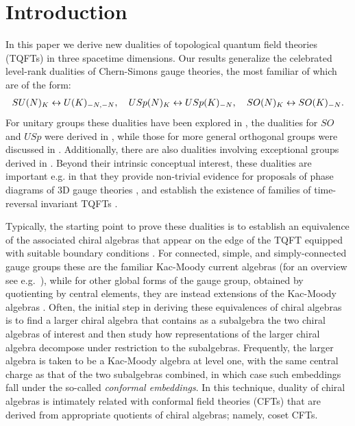 \documentclass[11pt]{article}
\numberwithin{equation}{section}
\begin{document}
\setcounter{tocdepth}{4}

\tableofcontents







\newpage

\section{Introduction}
\label{sec:intro}



In this paper we derive new dualities of topological quantum field theories (TQFTs) in three spacetime dimensions.  Our results generalize the celebrated level-rank dualities of Chern-Simons gauge theories, the most familiar of which are of the form:
\begin{equation}
\begin{tabular}{lll}
   $ SU(N)_{K}\leftrightarrow U(K)_{-N,-N}$, & $USp(N)_{K}\leftrightarrow USp(K)_{-N}$, & $SO(N)_{K}\leftrightarrow SO(K)_{-N}$.
    \end{tabular}
\end{equation}
For unitary groups these dualities have been explored in \cite{Nakanishi:1990hj,Naculich:1990pa, Mlawer:1990uv, Witten:1993xi, Douglas:1994ex, Naculich:2007nc, Hsin:2016blu}, the dualities for $SO$ and $USp$ were derived in \cite{Aharony:2016jvv}, while those for more general orthogonal groups were discussed in \cite{Cordova:2017vab}.  Additionally, there are also dualities involving exceptional groups derived in \cite{Cordova:2018qvg}. Beyond their intrinsic conceptual interest, these dualities are important e.g. in that they provide non-trivial evidence for proposals of phase diagrams of 3D gauge theories \cite{Hsin:2016blu, Gomis:2017ixy}, and establish the existence of families of time-reversal invariant TQFTs \cite{Cordova:2017kue}.


Typically, the starting point to prove these dualities is to establish an equivalence of the associated chiral algebras that appear on the edge of the TQFT equipped with suitable boundary conditions \cite{Witten:1988hf,Elitzur:1989nr}.  For connected, simple, and simply-connected gauge groups these are the familiar Kac-Moody current algebras (for an overview see e.g.\ \cite{DiFrancesco:1997nk}), while for other global forms of the gauge group, obtained by quotienting by central elements, they are instead extensions of the Kac-Moody algebras \cite{Moore:1989yh}. Often, the initial step in deriving these equivalences of chiral algebras is to find a larger chiral algebra that contains as a subalgebra the two chiral algebras of interest and then study how representations of the larger chiral algebra decompose under restriction to the subalgebras. Frequently, the larger algebra is taken to be a Kac-Moody algebra at level one, with the same central charge as that of the two subalgebras combined, in which case such embeddings fall under the so-called \emph{conformal embeddings}. In this technique, duality of chiral algebras is intimately related with conformal field theories (CFTs) that are derived from appropriate quotients of chiral algebras; namely, coset CFTs.  
\end{document}
